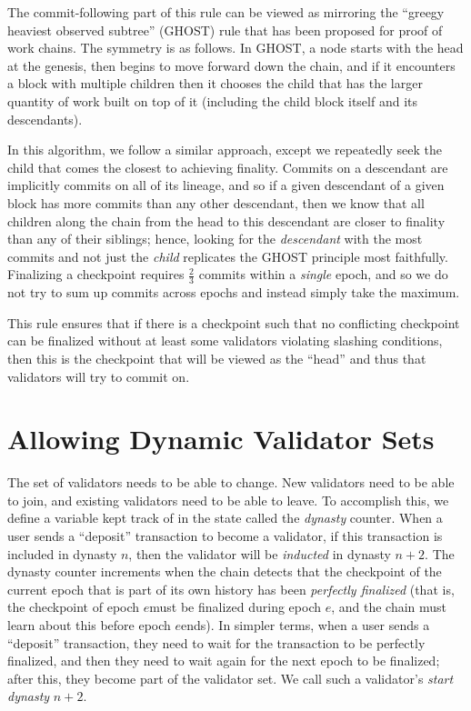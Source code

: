 \documentclass[12pt, final]{article}
\newcommand{\epoch}{\ensuremath{e}\space}
\begin{document}
The commit-following part of this rule can be viewed as mirroring the ``greegy heaviest observed subtree'' (GHOST) rule that has been proposed for proof of work chains\cite{sompolinsky2013accelerating}. The symmetry is as follows. In GHOST, a node starts with the head at the genesis, then begins to move forward down the chain, and if it encounters a block with multiple children then it chooses the child that has the larger quantity of work built on top of it (including the child block itself and its descendants).

In this algorithm, we follow a similar approach, except we repeatedly seek the child that comes the closest to achieving finality. Commits on a descendant are implicitly commits on all of its lineage, and so if a given descendant of a given block has more commits than any other descendant, then we know that all children along the chain from the head to this descendant are closer to finality than any of their siblings; hence, looking for the \textit{descendant} with the most commits and not just the \textit{child} replicates the GHOST principle most faithfully. Finalizing a checkpoint requires $\frac{2}{3}$ commits within a \textit{single} epoch, and so we do not try to sum up commits across epochs and instead simply take the maximum.

This rule ensures that if there is a checkpoint such that no conflicting checkpoint can be finalized without at least some validators violating slashing conditions, then this is the checkpoint that will be viewed as the ``head'' and thus that validators will try to commit on.

\section{Allowing Dynamic Validator Sets}
\label{sect:join_and_leave}

The set of validators needs to be able to change.  New validators need to be able to join, and existing validators need to be able to leave.  To accomplish this, we define a variable kept track of in the state called the \textit{dynasty} counter. When a user sends a ``deposit'' transaction to become a validator, if this transaction is included in dynasty $n$, then the validator will be \textit{inducted} in dynasty $n+2$. The dynasty counter increments when the chain detects that the checkpoint of the current epoch that is part of its own history has been \textit{perfectly finalized} (that is, the checkpoint of epoch \epoch must be finalized during epoch \epoch, and the chain must learn about this before epoch \epoch ends). In simpler terms, when a user sends a ``deposit'' transaction, they need to wait for the transaction to be perfectly finalized, and then they need to wait again for the next epoch to be finalized; after this, they become part of the validator set. We call such a validator's \textit{start dynasty} $n+2$.
\end{document}
